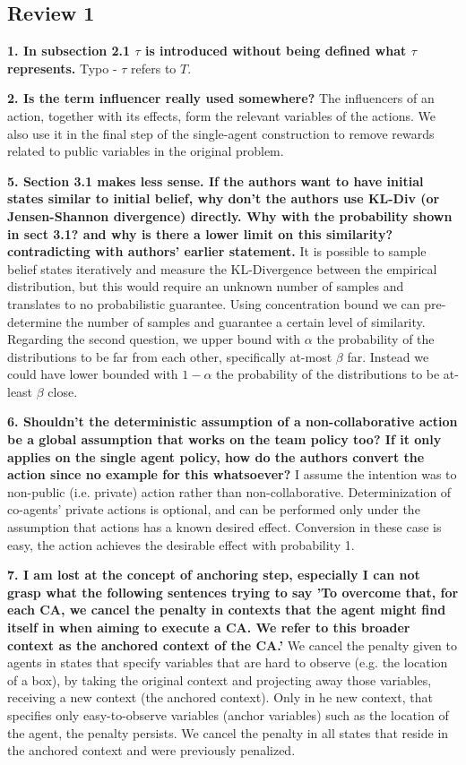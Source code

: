 \documentclass[a4paper]{article}
\begin{document}
\subsection{Review 1}
\textbf{1. In subsection 2.1 $\tau$ is introduced without being defined what $\tau$ represents.}
Typo - $\tau$ refers to $T$.

\textbf{2. Is the term influencer really used somewhere?}
The influencers of an action, together with its effects, form the relevant variables of the actions.
We also use it in the final step of the single-agent construction to remove rewards related to public variables in the original problem.

\textbf{5. Section 3.1 makes less sense. If the authors want to have initial states similar to initial belief, why don't the authors use KL-Div (or Jensen-Shannon divergence) directly. Why with the probability shown in sect 3.1? and why is there a lower limit on this similarity? contradicting with authors' earlier statement.}
It is possible to sample belief states iteratively and measure the KL-Divergence between the empirical distribution, but this would require an unknown number of samples and translates to no probabilistic guarantee. Using concentration bound we can pre-determine the number of samples and guarantee a certain level of similarity.
Regarding the second question, we upper bound with $\alpha$ the probability of the distributions to be far from each other, specifically at-most $\beta$ far. Instead we could have lower bounded with $1-\alpha$ the probability of the distributions to be at-least $\beta$ close.

\textbf{6. Shouldn't the deterministic assumption of a non-collaborative action be a global assumption that works on the team policy too? If it only applies on the single agent policy, how do the authors convert the action since no example for this whatsoever?}
I assume the intention was to non-public (i.e. private) action rather than non-collaborative. Determinization of co-agents' private actions is optional, and can be performed only under the assumption that actions has a known desired effect. Conversion in these case is easy, the action achieves the desirable effect with probability 1.

\textbf{7. I am lost at the concept of anchoring step, especially I can not grasp what the following sentences trying to say 'To overcome that, for each CA, we cancel the penalty in contexts that the agent might find itself in when aiming to execute a CA. We refer to this broader context as the anchored context of the CA.'}
We cancel the penalty given to agents in states that specify variables that are hard to observe (e.g. the location of a box), by taking the original context and projecting away those variables, receiving a new context (the anchored context). Only in he new context, that specifies only easy-to-observe variables (anchor variables) such as the location of the agent, the penalty persists. We cancel the penalty in all states that reside in the anchored context and were previously penalized.
\end{document}
